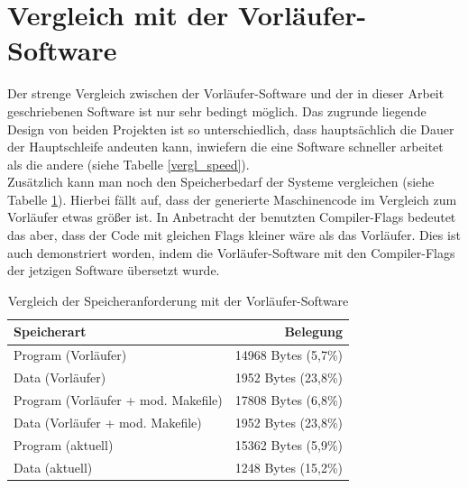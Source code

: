 \section{Vergleich mit der Vorläufer-Software}
Der strenge Vergleich zwischen der Vorläufer-Software und der in dieser Arbeit geschriebenen Software ist
nur sehr bedingt möglich. Das zugrunde liegende Design von beiden Projekten ist so unterschiedlich, dass hauptsächlich
die Dauer der Hauptschleife andeuten kann, inwiefern die eine Software schneller arbeitet als die andere
(siehe Tabelle \ref{vergl_speed}).\\
Zusätzlich kann man noch den Speicherbedarf der Systeme vergleichen (siehe Tabelle \ref{vergl_speicher}). Hierbei
fällt auf, dass der generierte Maschinencode im Vergleich zum Vorläufer etwas größer ist. In Anbetracht
der benutzten Compiler-Flags bedeutet das aber, dass der Code mit gleichen Flags kleiner wäre als das Vorläufer. Dies ist
auch demonstriert worden, indem die Vorläufer-Software mit den Compiler-Flags der jetzigen Software übersetzt
wurde.
\begin{table}[htb]
\begin{center}
	\begin{tabular}{|l||r|}
		\hline
		\textbf{Speicherart} & \textbf{Belegung} \\ \hline \hline
		Program (Vorläufer) & 14968 Bytes (5,7\%)  \\ \hline
		Data (Vorläufer)& 1952 Bytes (23,8\%) \\ \hline \hline
		Program (Vorläufer + mod. Makefile) & 17808 Bytes (6,8\%)  \\ \hline
		Data (Vorläufer + mod. Makefile) & 1952 Bytes (23,8\%) \\ \hline \hline
		Program (aktuell)& 15362 Bytes (5,9\%) \\ \hline
		Data (aktuell)& 1248 Bytes (15,2\%) \\ \hline
	\end{tabular}
	\caption{\label{vergl_speicher} Vergleich der Speicheranforderung mit der Vorläufer-Software}
\end{center}
\end{table}
